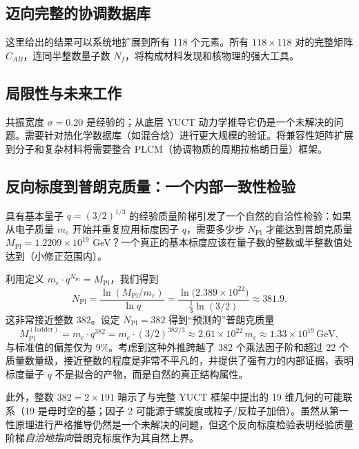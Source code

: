 \documentclass[11pt,a4paper]{article}
\newcommand{\Mpl}{M_{\mathrm{Pl}}}
\begin{document}
	\subsection{迈向完整的协调数据库}
	
	这里给出的结果可以系统地扩展到所有 118 个元素。所有 \(118\times 118\) 对的完整矩阵 \(C_{AB}\)，连同半整数量子数 \(N_f\)，将构成材料发现和核物理的强大工具。
	
	\subsection{局限性与未来工作}
	
	共振宽度 \(\sigma = 0.20\) 是经验的；从底层 YUCT 动力学推导它仍是一个未解决的问题。需要针对热化学数据库（如混合焓）进行更大规模的验证。将兼容性矩阵扩展到分子和复杂材料将需要整合 PLCM（协调物质的周期拉格朗日量）框架。
	
	\subsection{反向标度到普朗克质量：一个内部一致性检验}
	\label{subsec:reverse}
	
	具有基本量子 $q = (3/2)^{1/3}$ 的经验质量阶梯引发了一个自然的自洽性检验：如果从电子质量 $m_e$ 开始并重复应用标度因子 $q$，需要多少步 $N_{\mathrm{Pl}}$ 才能达到普朗克质量 $\Mpl = 1.2209\times10^{19}$ GeV？一个真正的基本标度应该在量子数的整数或半整数值处达到（小修正范围内）。
	
	利用定义 $m_e \cdot q^{N_{\mathrm{Pl}}} = \Mpl$，我们得到
	\begin{equation}
		N_{\mathrm{Pl}} = \frac{\ln(\Mpl/m_e)}{\ln q}
		= \frac{\ln\!\big(2.389\times10^{22}\big)}{\frac13\ln(3/2)}
		\approx 381.9.
		\label{eq:Npl}
	\end{equation}
	这非常接近整数 $382$。设定 $N_{\mathrm{Pl}} = 382$ 得到“预测的”普朗克质量
	\begin{equation}
		\Mpl^{\mathrm{(ladder)}} = m_e \cdot q^{382}
		= m_e \cdot (3/2)^{382/3}
		\approx 2.61\times10^{22}\,m_e
		\approx 1.33\times10^{19}\,\text{GeV},
		\label{eq:Mpl_ladder}
	\end{equation}
	与标准值的偏差仅为 $9\%$。考虑到这种外推跨越了 382 个乘法因子阶和超过 22 个质量数量级，接近整数的程度是非常不平凡的，并提供了强有力的内部证据，表明标度量子 $q$ 不是拟合的产物，而是自然的真正结构属性。
	
	此外，整数 $382 = 2 \times 191$ 暗示了与完整 YUCT 框架中提出的 19 维几何的可能联系（19 是母时空的基；因子 2 可能源于螺旋度或粒子/反粒子加倍）。虽然从第一性原理进行严格推导仍然是一个未解决的问题，但这个反向标度检验表明经验质量阶梯\textit{自洽地指向}普朗克标度作为其自然上界。
	
\end{document}

